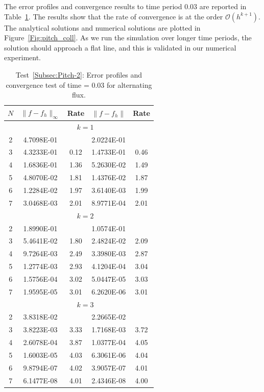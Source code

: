 \documentclass[preprint,11pt]{elsarticle}
\begin{document}
The error profiles and convergence results to time period $0.03$ are reported in Table~\ref{Tab:pitch_coll}. The results show that the rate of convergence is at the order $\mathcal{O}(h^{k+1})$.
The analytical solutions and numerical solutions are plotted in Figure~\ref{Fig:pitch_coll}. As we run the simulation over longer time periods, the solution should approach a flat line, and this is validated in our numerical experiment.

{\small
\begin{table}[H]
\caption{Test~\ref{Subsec:Pitch-2}: Error profiles and convergence test of time = $0.03$ for alternating flux.}\label{Tab:pitch_coll}
\centering
\begin{tabular}{c|cc|cc}	\hline\hline
$N$ & $\|f-f_h\|_{\infty}$ & Rate & $\|f-f_h\|$ & Rate \\ \hline		
&\multicolumn{4}{c}{$k=1$}\\ \hline
2	&4.7098E-01	&	&2.0224E-01	&\\
3	&4.3233E-01	&0.12	&1.4733E-01	&0.46\\
4	&1.6836E-01	&1.36	&5.2630E-02	&1.49\\
5	&4.8070E-02	&1.81	&1.4376E-02	&1.87\\
6	&1.2284E-02	&1.97	&3.6140E-03	&1.99\\
7	&3.0468E-03	&2.01	&8.9771E-04	&2.01\\ \hline		
&\multicolumn{4}{c}{$k=2$}\\ \hline
2	&1.8990E-01	&	&1.0574E-01 &	\\
3	&5.4641E-02	&1.80	&2.4824E-02	&2.09\\
4	&9.7264E-03	&2.49	&3.3980E-03	&2.87\\
5	&1.2774E-03	&2.93	&4.1204E-04	&3.04\\
6	&1.5756E-04	&3.02	&5.0447E-05	&3.03\\
7	&1.9595E-05	&3.01	&6.2620E-06	&3.01\\ \hline		
&\multicolumn{4}{c}{$k=3$}\\ \hline
2	&3.8318E-02	&	&2.2665E-02	&\\
3	&3.8223E-03	&3.33	&1.7168E-03	&3.72\\
4	&2.6078E-04	&3.87	&1.0377E-04	&4.05\\
5	&1.6003E-05	&4.03	&6.3061E-06	&4.04\\
6	&9.8794E-07	&4.02	&3.9057E-07	&4.01\\
7	&6.1477E-08	&4.01	&2.4346E-08	&4.00\\ \hline\hline
\end{tabular}
\end{table}
}
\end{document}

